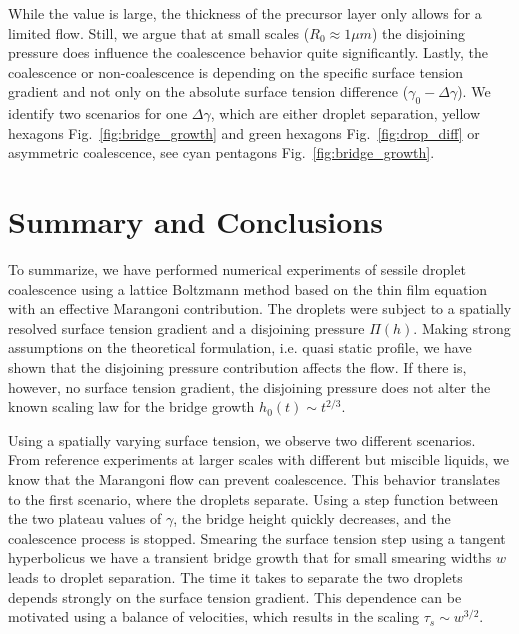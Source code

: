 While the value is large, the thickness of the precursor layer only allows for a limited flow. 
Still, we argue that at small scales ($R_0 \approx 1\mu m$) the disjoining pressure does influence the coalescence behavior quite significantly.
Lastly, the coalescence or non-coalescence is depending on the specific surface tension gradient and not only on the absolute surface tension difference ($\gamma_0-\Delta\gamma$).
We identify two scenarios for one $\Delta\gamma$, which are either droplet separation, yellow hexagons Fig.~\ref{fig:bridge_growth} and green hexagons Fig.~\ref{fig:drop_diff} or asymmetric coalescence, see cyan pentagons Fig.~\ref{fig:bridge_growth}.

\section{Summary and Conclusions}\label{sec:sum_conclu_five}

To summarize, we have performed numerical experiments of sessile droplet coalescence using a lattice Boltzmann method based on the thin film equation with an effective Marangoni contribution.
The droplets were subject to a spatially resolved surface tension gradient and a disjoining pressure $\Pi(h)$.
Making strong assumptions on the theoretical formulation, i.e. quasi static profile, we have shown that the disjoining pressure contribution affects the flow.
If there is, however, no surface tension gradient, the disjoining pressure does not alter the known scaling law for the bridge growth $h_0(t) \sim t^{2/3}$.

Using a spatially varying surface tension, we observe two different scenarios.
From reference experiments at larger scales with different but miscible liquids, we know that the Marangoni flow can prevent coalescence.
This behavior translates to the first scenario, where the droplets separate.
Using a step function between the two plateau values of $\gamma$, the bridge height quickly decreases, and the coalescence process is stopped.
Smearing the surface tension step using a tangent hyperbolicus we have a transient bridge growth that for small smearing widths $w$ leads to droplet separation.
The time it takes to separate the two droplets depends strongly on the surface tension gradient.
This dependence can be motivated using a balance of velocities, which results in the scaling $\tau_s\sim w^{3/2}$.  

